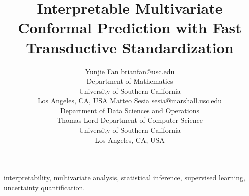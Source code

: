 \documentclass[11pt]{article}
\begin{document}
\title{Interpretable Multivariate Conformal Prediction with Fast Transductive Standardization}

\author{\name Yunjie Fan \email brianfan@usc.edu \\
       \addr Department of Mathematics\\
       University of Southern California\\
       Los Angeles, CA, USA
       \AND
       \name Matteo Sesia \email sesia@marshall.usc.edu \\
       \addr Department of Data Sciences and Operations\\
       {Thomas Lord Department of Computer Science\\
       University of Southern California\\
       Los Angeles, CA, USA}
}

\maketitle

\begin{abstract}%

\end{abstract}

\begin{keywords}
interpretability, multivariate analysis, statistical inference, supervised learning, uncertainty quantification.
\end{keywords}



 

\newpage

\appendix

\end{document}
